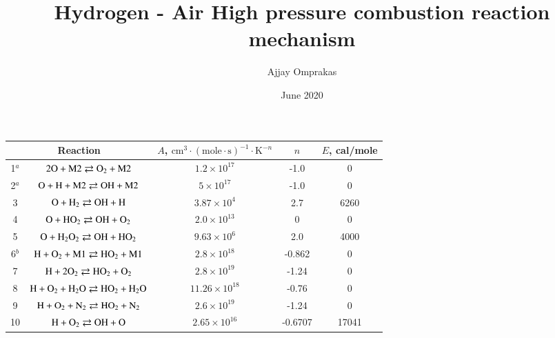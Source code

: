 \documentclass{warpdoc}
\author{
  Ajjay Omprakas 
}
\title{Hydrogen - Air High pressure combustion reaction mechanism
}
\date{
  June 2020
}
\renewcommand{\fontsizetable}{\footnotesize\scalefont{0.9}}
\begin{document}
  \pagestyle{headings}
  \setcounter{page}{1}
  \makewarpdoctitle









%
\begin{table}[t]
\fontsizetable
\begin{center}
\begin{threeparttable}
\begin{tabular}{ccccc} 
\toprule
\multicolumn{2}{c}{Reaction} & $A$, $\textrm{cm}^3\cdot(\textrm{mole}\cdot \textrm{s})^{-1}\cdot \textrm{K}^{-n}$ & $n$ & $E$, cal/mole  \\ 
\midrule
    1$^a$ & $\rm 2O + M2 \rightleftarrows  O_2 + M2$&$1.2 \times 10^{17}$& -1.0 &  0\\
    2$^a$ & $\rm O +  H + M2 \rightleftarrows  OH + M2$  & $ 5 \times 10^{17} $& -1.0 &  0\\
    3& $\rm O +  H_2  \rightleftarrows  OH + H$  & $ 3.87 \times 10^{4} $& 2.7 & 6260 \\
    4 & $\rm O +  HO_2  \rightleftarrows  OH + O_2$  & $ 2.0 \times 10^{13} $& 0 & 0 \\
    5 & $\rm O +  H_2O_2  \rightleftarrows  OH + HO_2$  & $ 9.63 \times 10^{6} $& 2.0 & 4000  \\
    6$^b$ & $\rm H + O_2 + M1  \rightleftarrows  HO_2 + M1$  & $ 2.8 \times 10^{18} $& -0.862 & 0 \\
    7 & $\rm H + 2O_2  \rightleftarrows  HO_2 + O_2$  & $ 2.8 \times 10^{19} $& -1.24 & 0 \\
    8 & $\rm H + O_2 + H_2O  \rightleftarrows  HO_2 + H_2O$  & $ 11.26 \times 10^{18} $& -0.76 & 0 \\
    9 & $\rm H + O_2 + N_2  \rightleftarrows  HO_2 + N_2$  & $ 2.6 \times 10^{19} $& -1.24 & 0 \\
    10 & $\rm H + O_2 \rightleftarrows  OH + O$  & $ 2.65 \times 10^{16} $& -0.6707 & 17041 \\

\end{tabular}
\end{threeparttable}
\end{center}
\end{table}
\end{document}

